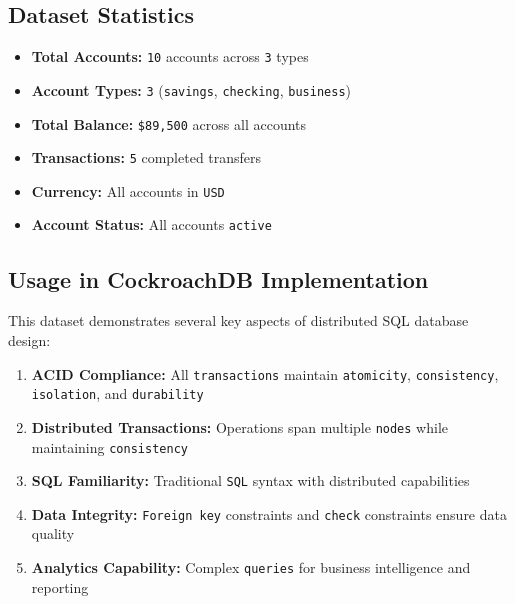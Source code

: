 \subsection{Dataset Statistics}

\begin{itemize}
    \item \textbf{Total Accounts:} \texttt{10} accounts across \texttt{3} types
    \item \textbf{Account Types:} \texttt{3} (\texttt{savings}, \texttt{checking}, \texttt{business})
    \item \textbf{Total Balance:} \texttt{\$89,500} across all accounts
    \item \textbf{Transactions:} \texttt{5} completed transfers
    \item \textbf{Currency:} All accounts in \texttt{USD}
    \item \textbf{Account Status:} All accounts \texttt{active}
\end{itemize}

\subsection{Usage in CockroachDB Implementation}

This dataset demonstrates several key aspects of distributed SQL database design:

\begin{enumerate}
    \item \textbf{ACID Compliance:} All \texttt{transactions} maintain \texttt{atomicity}, \texttt{consistency}, \texttt{isolation}, and \texttt{durability}
    \item \textbf{Distributed Transactions:} Operations span multiple \texttt{nodes} while maintaining \texttt{consistency}
    \item \textbf{SQL Familiarity:} Traditional \texttt{SQL} syntax with distributed capabilities
    \item \textbf{Data Integrity:} \texttt{Foreign key} constraints and \texttt{check} constraints ensure data quality
    \item \textbf{Analytics Capability:} Complex \texttt{queries} for business intelligence and reporting
\end{enumerate}